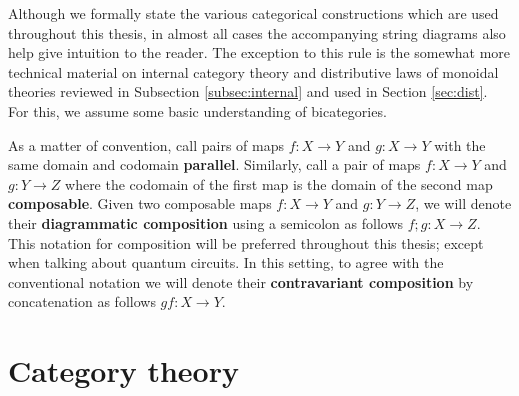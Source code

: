 

Although we formally state the various categorical constructions which are used throughout this thesis, in almost all cases the accompanying string diagrams also help give intuition to the reader.  The exception to this rule is the somewhat more technical  material on internal category theory and distributive laws of monoidal theories reviewed in Subsection \ref{subsec:internal} and used in Section \ref{sec:dist}.  For this, we assume some basic understanding of bicategories.  %


As a matter of convention, call pairs of maps $f:X\to Y$ and $g:X\to Y$ with the same domain and codomain {\bf parallel}.   Similarly, call a pair of maps $f:X\to Y$ and $g:Y\to Z$ where the codomain of the first map is the domain of the second map {\bf composable}.
Given two composable maps $f:X\to Y$ and $g:Y \to Z$, we will denote their {\bf diagrammatic composition} using a semicolon as follows $f;g:X\to Z$. This notation for composition will be preferred throughout this thesis; except when talking about quantum circuits.  In this setting, to agree with the conventional notation we will denote their {\bf contravariant composition} by concatenation as follows $gf:X\to Y$.



\section{Category theory}
\label{sec:cat}






